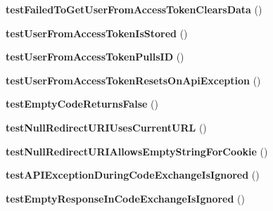 \begin{DoxyCompactItemize}
\item 
\hypertarget{class_p_h_p_s_d_k_test_case_ae7e2caa0465140a1ad21754bec79e603}{{\bfseries test\-Failed\-To\-Get\-User\-From\-Access\-Token\-Clears\-Data} ()}\label{class_p_h_p_s_d_k_test_case_ae7e2caa0465140a1ad21754bec79e603}

\item 
\hypertarget{class_p_h_p_s_d_k_test_case_a3cb879cf36fa423a1f03ceec4c842a8b}{{\bfseries test\-User\-From\-Access\-Token\-Is\-Stored} ()}\label{class_p_h_p_s_d_k_test_case_a3cb879cf36fa423a1f03ceec4c842a8b}

\item 
\hypertarget{class_p_h_p_s_d_k_test_case_a5de6aff91b4202eb90b96bb7dd4bcbe5}{{\bfseries test\-User\-From\-Access\-Token\-Pulls\-I\-D} ()}\label{class_p_h_p_s_d_k_test_case_a5de6aff91b4202eb90b96bb7dd4bcbe5}

\item 
\hypertarget{class_p_h_p_s_d_k_test_case_a47d26442b48f921295516045d0d622b5}{{\bfseries test\-User\-From\-Access\-Token\-Resets\-On\-Api\-Exception} ()}\label{class_p_h_p_s_d_k_test_case_a47d26442b48f921295516045d0d622b5}

\item 
\hypertarget{class_p_h_p_s_d_k_test_case_ad0caf973737360eed6354010c915443a}{{\bfseries test\-Empty\-Code\-Returns\-False} ()}\label{class_p_h_p_s_d_k_test_case_ad0caf973737360eed6354010c915443a}

\item 
\hypertarget{class_p_h_p_s_d_k_test_case_a642aa8905fcf3d29ecb0f166d87cf55a}{{\bfseries test\-Null\-Redirect\-U\-R\-I\-Uses\-Current\-U\-R\-L} ()}\label{class_p_h_p_s_d_k_test_case_a642aa8905fcf3d29ecb0f166d87cf55a}

\item 
\hypertarget{class_p_h_p_s_d_k_test_case_ac74b6eba72d4beadf35e4e94f6d2e88c}{{\bfseries test\-Null\-Redirect\-U\-R\-I\-Allows\-Empty\-String\-For\-Cookie} ()}\label{class_p_h_p_s_d_k_test_case_ac74b6eba72d4beadf35e4e94f6d2e88c}

\item 
\hypertarget{class_p_h_p_s_d_k_test_case_a8041e9819b825d416b9cf96fd02091d9}{{\bfseries test\-A\-P\-I\-Exception\-During\-Code\-Exchange\-Is\-Ignored} ()}\label{class_p_h_p_s_d_k_test_case_a8041e9819b825d416b9cf96fd02091d9}

\item 
\hypertarget{class_p_h_p_s_d_k_test_case_a716d6330f6b9bde01093ed3ac5d3b1de}{{\bfseries test\-Empty\-Response\-In\-Code\-Exchange\-Is\-Ignored} ()}\label{class_p_h_p_s_d_k_test_case_a716d6330f6b9bde01093ed3ac5d3b1de}


\end{DoxyCompactItemize}
